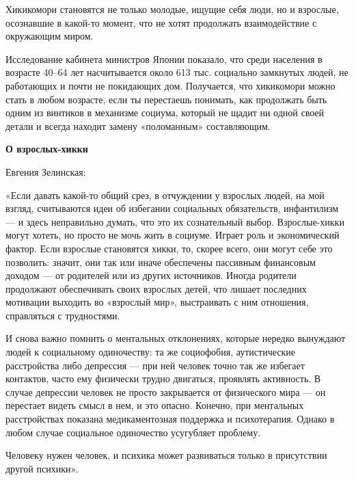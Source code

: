Хикикомори становятся не только молодые, ищущие себя люди, но и взрослые, осознавшие в какой-то момент, что не хотят продолжать взаимодействие с окружающим миром.

Исследование кабинета министров Японии показало, что среди населения в возрасте 40–64 лет насчитывается около 613 тыс. социально замкнутых людей, не работающих и почти не покидающих дом. Получается, что хикикомори можно стать в любом возрасте, если ты перестаешь понимать, как продолжать быть одним из винтиков в механизме социума, который не щадит ни одной своей детали и всегда находит замену «поломанным» составляющим.

\textbf{О взрослых-хикки}

Евгения Зелинская:

\setlength{\leftskip}{2cm}


«Если давать какой-то общий срез, в отчуждении у взрослых людей, на мой взгляд, считываются идеи об избегании социальных обязательств, инфантилизм — и здесь неправильно думать, что это их сознательный выбор. Взрослые-хикки могут хотеть, но просто не мочь жить в социуме. Играет роль и экономический фактор. Если взрослые становятся хикки, то, скорее всего, они могут себе это позволить: значит, они так или иначе обеспечены пассивным финансовым доходом — от родителей или из других источников. Иногда родители продолжают обеспечивать своих взрослых детей, что лишает последних мотивации выходить во «взрослый мир», выстраивать с ним отношения, справляться с трудностями.

И снова важно помнить о ментальных отклонениях, которые нередко вынуждают людей к социальному одиночеству: та же социофобия, аутистические расстройства либо депрессия — при ней человек точно так же избегает контактов, часто ему физически трудно двигаться, проявлять активность. В случае депрессии человек не просто закрывается от физического мира — он перестает видеть смысл в нем, и это опасно. Конечно, при ментальных расстройствах показана медикаментозная поддержка и психотерапия. Однако в любом случае социальное одиночество усугубляет проблему.

Человеку нужен человек, и психика может развиваться только в присутствии другой психики».

\setlength{\leftskip}{0cm}